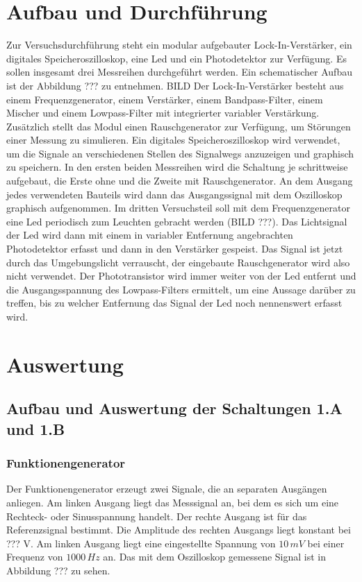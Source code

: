 \documentclass[11pt]{article}
\begin{document}
\section{Aufbau und Durchf\"{u}hrung}
Zur Versuchsdurchführung steht ein modular aufgebauter Lock-In-Verstärker, ein digitales Speicheroszilloskop, eine Led und ein Photodetektor zur Verfügung. Es sollen insgesamt drei Messreihen durchgeführt werden.
Ein schematischer Aufbau ist der Abbildung ??? zu entnehmen.\newline
BILD\newline
Der Lock-In-Verstärker besteht aus einem Frequenzgenerator, einem Verstärker, einem Bandpass-Filter, einem Mischer und einem Lowpass-Filter mit integrierter variabler Verstärkung. Zusätzlich stellt das Modul einen Rauschgenerator zur Verfügung, um Störungen einer Messung zu simulieren. Ein digitales Speicheroszilloskop wird verwendet, um die Signale an verschiedenen Stellen des Signalwegs anzuzeigen und graphisch zu speichern. In den ersten beiden Messreihen wird die Schaltung je schrittweise aufgebaut, die Erste ohne und die Zweite mit Rauschgenerator. An dem Ausgang jedes verwendeten Bauteils wird dann das Ausgangssignal mit dem Oszilloskop graphisch aufgenommen.\newline
Im dritten Versuchsteil soll mit dem Frequenzgenerator eine Led periodisch zum Leuchten gebracht werden (BILD ???). \newline
\newline
Das Lichtsignal der Led wird dann mit einem in variabler Entfernung angebrachten Photodetektor erfasst und dann in den Verstärker gespeist. Das Signal ist jetzt durch das Umgebungslicht verrauscht, der eingebaute Rauschgenerator wird also nicht verwendet. Der Phototransistor wird immer weiter von der Led entfernt und die Ausgangsspannung des Lowpass-Filters ermittelt, um eine Aussage darüber zu treffen, bis zu welcher Entfernung das Signal der Led noch nennenswert erfasst wird.
\section{Auswertung}
\subsection{Aufbau und Auswertung der Schaltungen 1.A und 1.B}
\subsubsection{Funktionengenerator}
Der Funktionengenerator erzeugt zwei Signale, die an separaten Ausgängen anliegen. Am linken Ausgang liegt das Messsignal an, bei dem es sich um eine Rechteck- oder Sinusspannung handelt. Der rechte Ausgang ist für das Referenzsignal bestimmt. Die Amplitude des rechten Ausgangs liegt konstant bei ??? V. Am linken Ausgang liegt eine eingestellte Spannung von $10 \, mV$ bei einer Frequenz von $1000 \, Hz$ an. Das mit dem Oszilloskop gemessene Signal ist in Abbildung ??? zu sehen.
\end{document}

